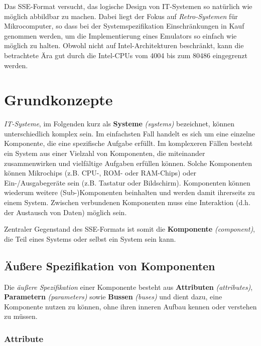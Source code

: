 \documentclass{scrartcl}
\begin{document}
\vspace{10pt}
\noindent Das SSE-Format versucht, das logische Design von IT-Systemen so natürlich wie möglich abbildbar zu machen. Dabei liegt der Fokus auf \textit{Retro-Systemen} für Mikrocomputer, so dass bei der Systemspezifikation Einschränkungen in Kauf genommen werden, um die Implementierung eines Emulators so einfach wie möglich zu halten. Obwohl nicht auf Intel-Architekturen beschränkt, kann die betrachtete Ära gut durch die Intel-CPUs vom 4004 bis zum 80486 eingegrenzt werden.

\section{Grundkonzepte}

\noindent \textit{IT-Systeme}, im Folgenden kurz als \textbf{Systeme} \textit{(systems)} bezeichnet, können unterschiedlich komplex sein. Im einfachsten Fall handelt es sich um eine einzelne Komponente, die eine spezifische Aufgabe erfüllt. Im komplexeren Fällen besteht ein System aus einer Vielzahl von Komponenten, die miteinander zusammenwirken und vielfältige Aufgaben erfüllen können. Solche Komponenten können Mikrochips (z.B. CPU-, ROM- oder RAM-Chips) oder Ein-/Ausgabegeräte sein (z.B. Tastatur oder Bildschirm). Komponenten können wiederum weitere (Sub-)Komponenten beinhalten und werden damit ihrerseits zu einem System. Zwischen verbundenen Komponenten muss eine Interaktion (d.h. der Austausch von Daten) möglich sein.

\vspace{10pt}
\noindent Zentraler Gegenstand des SSE-Formats ist somit die \textbf{Komponente} \textit{(component)}, die Teil eines Systems oder selbst ein System sein kann.

\subsection{Äußere Spezifikation von Komponenten}

\noindent Die \textit{äußere Spezifikation} einer Komponente besteht aus \textbf{Attributen} \textit{(attributes)}, \textbf{Parametern} \textit{(parameters)} sowie \textbf{Bussen} \textit{(buses)} und dient dazu, eine Komponente nutzen zu können, ohne ihren inneren Aufbau kennen oder verstehen zu müssen.

\subsubsection{Attribute}
\end{document}
